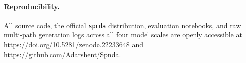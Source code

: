 \documentclass[11pt]{article}
\begin{document}
\paragraph{Reproducibility.} All source code, the official \texttt{spnda} distribution, evaluation notebooks, and raw multi-path generation logs across all four model scales are openly accessible at \url{https://doi.org/10.5281/zenodo.22233648} and \url{https://github.com/Adarshent/Spnda}.


\end{document}

